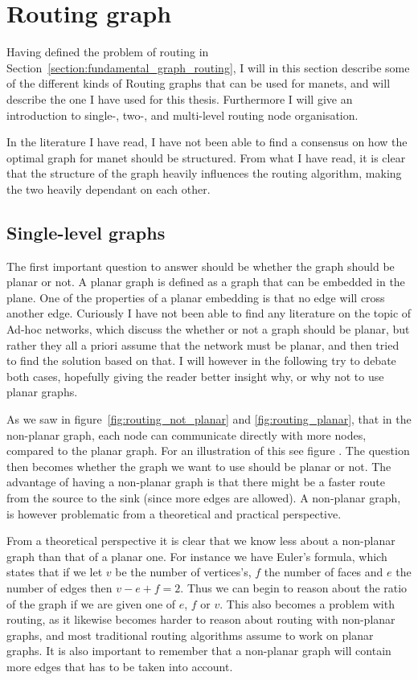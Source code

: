\section{Routing graph}
\label{section:routing_graph}

Having defined the problem of routing in Section~\ref{section:fundamental_graph_routing}, I will in this section describe some of the different kinds of Routing graphs that can be used for \acp{manet}, and will describe the one I have used for this thesis. Furthermore I will give an introduction to single-, two-, and multi-level routing node organisation. 

In the literature I have read, I have not been able to find a consensus on how the optimal graph for \ac{manet} should be structured. From what I have read, it is clear that the structure of the graph heavily influences the routing algorithm, making the two heavily dependant on each other. 

\subsection{Single-level graphs}
\label{single_level}
The first important question to answer should be whether the graph should be planar or not. A planar graph is defined as a graph that can be embedded in the plane. One of the properties of a planar embedding is that no edge will cross another edge.
Curiously I have not been able to find any literature on the topic of Ad-hoc networks, which discuss the whether or not a graph should be planar, but rather they all a priori assume that the network must be planar, and then tried to find the solution based on that. I will however in the following try to debate both cases, hopefully giving the reader better insight why, or why not to use planar graphs.

 As we saw in figure~\ref{fig:routing_not_planar} and \ref{fig:routing_planar}, that in the non-planar graph, each node can communicate directly with more nodes, compared to the planar graph. For an illustration of this see figure . The question then becomes whether the graph we want to use should be planar or not. The advantage of having a non-planar graph is that there might be a faster route from the source to the sink (since more edges are allowed). A non-planar graph, is however problematic from a theoretical and practical perspective.

From a theoretical perspective it is clear that we know less about a non-planar graph than that of a planar one. For instance we have Euler's formula, which states that if we let $v$ be the number of vertices's, $f$ the number of faces and $e$ the number of edges then $v - e + f = 2$. Thus we can begin to reason about the ratio of the graph if we are given one of $e$, $f$ or $v$. This also becomes a problem with routing, as it likewise becomes harder to reason about routing with non-planar graphs, and most traditional routing algorithms assume to work on planar graphs. It is also important to remember that a non-planar graph will contain more edges that has to be taken into account.

